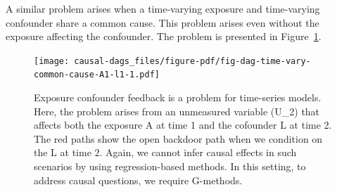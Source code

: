 \documentclass[
  singlecolumn]{report}
\begin{document}
A similar problem arises when a time-varying exposure and time-varying
confounder share a common cause. This problem arises even without the
exposure affecting the confounder. The problem is presented in
Figure~\ref{fig-dag-time-vary-common-cause-A1-l1}.

\begin{figure}

{\centering \texttt{[image: causal-dags\_files/figure-pdf/fig-dag-time-vary-common-cause-A1-l1-1.pdf]}

}

\caption{\label{fig-dag-time-vary-common-cause-A1-l1}Exposure confounder
feedback is a problem for time-series models. Here, the problem arises
from an unmeasured variable (U\_2) that affects both the exposure A at
time 1 and the cofounder L at time 2. The red paths show the open
backdoor path when we condition on the L at time 2. Again, we cannot
infer causal effects in such scenarios by using regression-based
methods. In this setting, to address causal questions, we require
G-methods.}

\end{figure}
\end{document}

